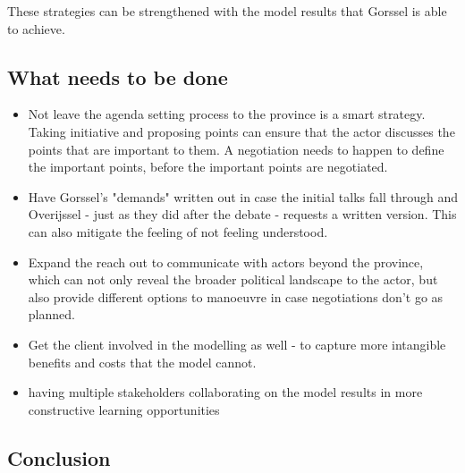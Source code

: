 These strategies can be strengthened with the model results that Gorssel is able to achieve. 
\subsection{What needs to be done}

\begin{itemize}
    \item Not leave the agenda setting process to the province is a smart strategy. Taking initiative and proposing points can ensure that the actor discusses the points that are important to them. A negotiation needs to happen to define the important points, before the important points are negotiated.
    \item Have Gorssel's "demands" written out in case the initial talks fall through and Overijssel - just as they did after the debate - requests a written version. This can also mitigate the feeling of not feeling understood.  
    \item Expand the reach out to communicate with actors beyond the province, which can not only reveal the broader political landscape to the actor, but also provide different options to manoeuvre in case negotiations don't go as planned.
    \item Get the client involved in the modelling as well - to capture more intangible benefits and costs that the model cannot.
    \item having multiple stakeholders collaborating on the model results in more constructive learning opportunities
\end{itemize}

\subsection{Conclusion}

